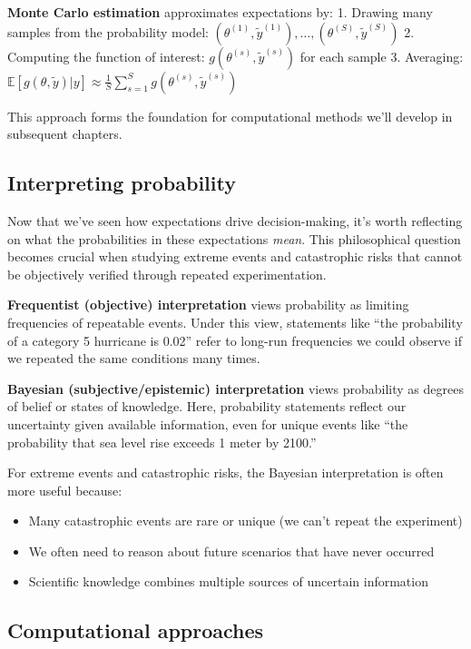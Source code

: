 \documentclass[
  letterpaper,
  DIV=11,
  numbers=noendperiod]{scrreprt}
\providecommand{\tightlist}{%
  \setlength{\itemsep}{0pt}\setlength{\parskip}{0pt}}
\begin{document}
\textbf{Monte Carlo estimation} approximates expectations by: 1. Drawing
many samples from the probability model:
\((\theta^{(1)}, \tilde{y}^{(1)}), \ldots, (\theta^{(S)}, \tilde{y}^{(S)})\)
2. Computing the function of interest:
\(g(\theta^{(s)}, \tilde{y}^{(s)})\) for each sample 3. Averaging:
\(\mathbb{E}[g(\theta, \tilde{y}) | y] \approx \frac{1}{S} \sum_{s=1}^S g(\theta^{(s)}, \tilde{y}^{(s)})\)

This approach forms the foundation for computational methods we'll
develop in subsequent chapters.

\subsection{Interpreting probability}\label{interpreting-probability}

Now that we've seen how expectations drive decision-making, it's worth
reflecting on what the probabilities in these expectations \emph{mean}.
This philosophical question becomes crucial when studying extreme events
and catastrophic risks that cannot be objectively verified through
repeated experimentation.

\textbf{Frequentist (objective) interpretation} views probability as
limiting frequencies of repeatable events. Under this view, statements
like ``the probability of a category 5 hurricane is 0.02'' refer to
long-run frequencies we could observe if we repeated the same conditions
many times.

\textbf{Bayesian (subjective/epistemic) interpretation} views
probability as degrees of belief or states of knowledge. Here,
probability statements reflect our uncertainty given available
information, even for unique events like ``the probability that sea
level rise exceeds 1 meter by 2100.''

For extreme events and catastrophic risks, the Bayesian interpretation
is often more useful because:

\begin{itemize}
\tightlist
\item
  Many catastrophic events are rare or unique (we can't repeat the
  experiment)
\item
  We often need to reason about future scenarios that have never
  occurred
\item
  Scientific knowledge combines multiple sources of uncertain
  information
\end{itemize}

\subsection{Computational approaches}\label{computational-approaches}
\end{document}
